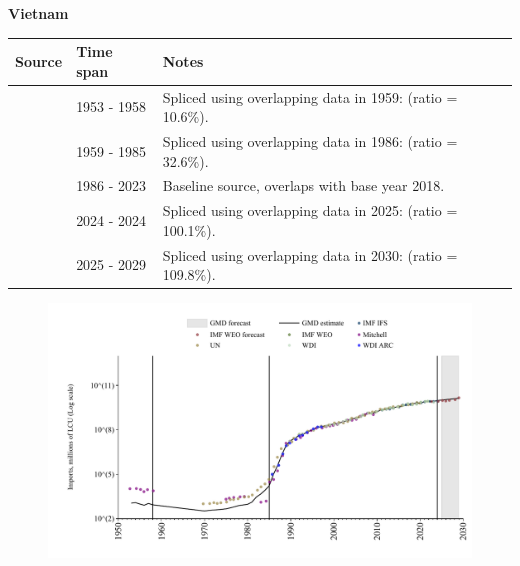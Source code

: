 \documentclass[12pt,a4paper,landscape]{article}
\begin{document}
\begin{adjustbox}{max totalsize={\paperwidth}{\paperheight},center}
\begin{minipage}[t][\textheight][t]{\textwidth}
\vspace*{0.5cm}
{}
\begin{center}
{\Large\bfseries Vietnam}
\end{center}
\vspace{0.5cm}
\begin{table}[H]
\centering
\small
\begin{tabular}{|l|l|l|}
\hline
\textbf{Source} & \textbf{Time span} & \textbf{Notes} \\
\hline
\rowcolor{white}\cite{Mitchell}& 1953 - 1958 &Spliced using overlapping data in 1959: (ratio = 10.6\%).\\
\rowcolor{lightgray}\cite{UN}& 1959 - 1985 &Spliced using overlapping data in 1986: (ratio = 32.6\%).\\
\rowcolor{white}\cite{WDI}& 1986 - 2023 &Baseline source, overlaps with base year 2018.\\
\rowcolor{lightgray}\cite{IMF_IFS}& 2024 - 2024 &Spliced using overlapping data in 2025: (ratio = 100.1\%).\\
\rowcolor{white}\cite{IMF_WEO_forecast}& 2025 - 2029 &Spliced using overlapping data in 2030: (ratio = 109.8\%).\\
\hline
\end{tabular}
\end{table}
\begin{figure}[H]
\centering
\includegraphics[width=\textwidth,height=0.6\textheight,keepaspectratio]{graphs/VNM_imports.pdf}
\end{figure}
\end{minipage}
\end{adjustbox}
\end{document}
